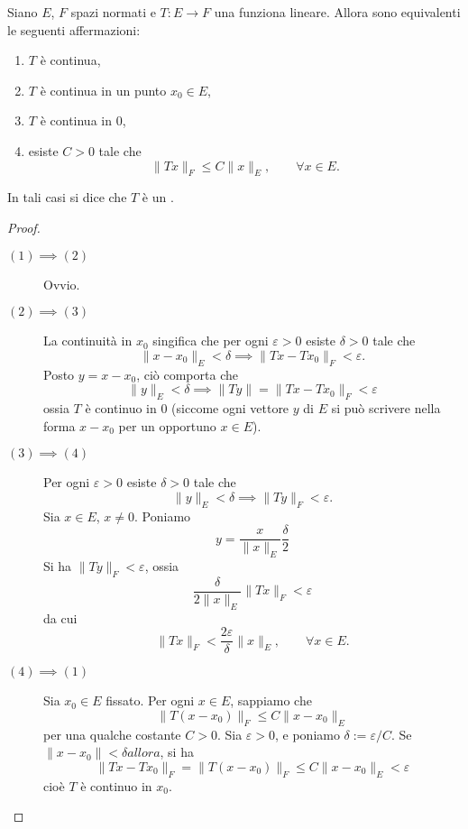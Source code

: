 \begin{theorem}
	Siano $E$, $F$ spazi normati e $T: E \to F$ una funziona lineare. Allora sono equivalenti le seguenti affermazioni:
	\begin{enumerate}
		\item $T$ è continua,
		\item $T$ è continua in un punto $x_0 \in E$,
		\item $T$ è continua in $0$,
		\item esiste $C > 0$ tale che
		$$
			\|Tx\|_F \leq C \|x\|_E, \qquad \forall x \in E.
		$$
	\end{enumerate}
	In tali casi si dice che $T$ è un .
\end{theorem}
\begin{proof}
	\leavevmode
	\begin{description}
		\item[$(1) \implies (2)$] Ovvio.
		\item[$(2) \implies (3)$] La continuità in $x_0$ singifica che per ogni $\varepsilon > 0$ esiste $\delta > 0$ tale che
		$$
			\|x-x_0\|_E < \delta \implies \|Tx - Tx_0\|_F < \varepsilon.
		$$
		Posto $y = x-x_0$, ciò comporta che
		$$
			\|y\|_E < \delta \implies \|Ty\| = \|Tx - Tx_0\|_F < \varepsilon
		$$
		ossia $T$ è continuo in $0$ (siccome ogni vettore $y$ di $E$ si può scrivere nella forma $x-x_0$ per un opportuno $x \in E$).
		\item[$(3) \implies (4)$] Per ogni $\varepsilon > 0$ esiste $\delta > 0$ tale che
		$$
			\|y\|_E < \delta \implies \|Ty\|_F < \varepsilon.
		$$
		Sia $x \in E$, $x \neq 0$. Poniamo
		$$
			y = \frac{x}{\|x\|_E}\frac{\delta}2
		$$
		Si ha $\|Ty\|_F < \varepsilon$, ossia
		$$
			\frac{\delta}{2\|x\|_E} \|Tx\|_F < \varepsilon
		$$
		da cui
		$$
			\|Tx\|_F < \frac{2\varepsilon}{\delta} \|x\|_E, \qquad \forall x \in E.
		$$
		\item[$(4) \implies (1)$] Sia $x_0 \in E$ fissato. Per ogni $x \in E$, sappiamo che
		$$
			\|T(x-x_0)\|_F \leq C \|x-x_0\|_E
		$$
		per una qualche costante $C > 0$. Sia $\varepsilon > 0$, e poniamo $\delta := \varepsilon/C$. Se $\|x-x_0\| < \delta allora$, si ha
		$$
			\|Tx - Tx_0\|_F = \|T(x-x_0)\|_F \leq C\|x-x_0\|_E < \varepsilon
		$$
		cioè $T$ è continuo in $x_0$.
	\end{description}
\end{proof}

